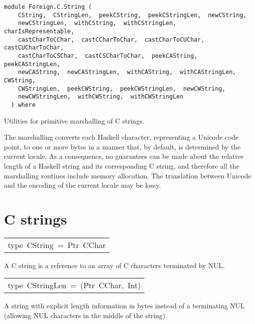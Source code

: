 \label{module:Foreign.C.String}
\haddockbeginheader
{\haddockverb\begin{verbatim}
module Foreign.C.String (
    CString,  CStringLen,  peekCString,  peekCStringLen,  newCString, 
    newCStringLen,  withCString,  withCStringLen,  charIsRepresentable, 
    castCharToCChar,  castCCharToChar,  castCharToCUChar,  castCUCharToChar, 
    castCharToCSChar,  castCSCharToChar,  peekCAString,  peekCAStringLen, 
    newCAString,  newCAStringLen,  withCAString,  withCAStringLen,  CWString, 
    CWStringLen,  peekCWString,  peekCWStringLen,  newCWString, 
    newCWStringLen,  withCWString,  withCWStringLen
  ) where\end{verbatim}}
\haddockendheader

Utilities for primitive marshalling of C strings.
\par
The marshalling converts each Haskell character, representing a Unicode
 code point, to one or more bytes in a manner that, by default, is
 determined by the current locale.  As a consequence, no guarantees
 can be made about the relative length of a Haskell string and its
 corresponding C string, and therefore all the marshalling routines
 include memory allocation.  The translation between Unicode and the
 encoding of the current locale may be lossy.
\par

\section{C strings
}
\begin{haddockdesc}
\item[\begin{tabular}{@{}l}
type\ CString\ =\ Ptr\ CChar
\end{tabular}]\haddockbegindoc
A C string is a reference to an array of C characters terminated by NUL.
\par

\end{haddockdesc}
\begin{haddockdesc}
\item[\begin{tabular}{@{}l}
type\ CStringLen\ =\ (Ptr\ CChar,\ Int)
\end{tabular}]\haddockbegindoc
A string with explicit length information in bytes instead of a
 terminating NUL (allowing NUL characters in the middle of the string).
\par

\end{haddockdesc}
